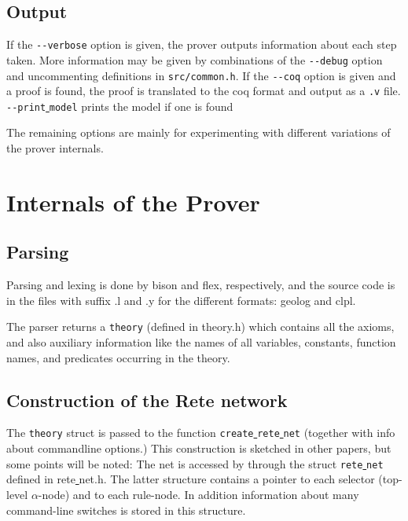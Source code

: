 \documentclass[a4paper]{article}
\begin{document}
\subsection{Output}
If the \verb|--verbose| option is given, the prover outputs information about each step taken. More information may be given by combinations of the \verb|--debug| option and uncommenting definitions in \verb|src/common.h|. 
If the \verb|--coq| option is given and a proof is found, the proof is translated to the coq format and output as a \verb|.v| file. \verb|--print|\underline{ }\verb|model| prints the model if one is found


The remaining options are mainly for experimenting with different variations of the prover internals. 

\section{Internals of the Prover}

\subsection{Parsing}
Parsing and lexing is done by bison and flex, respectively, and the source code is in the files with suffix .l and .y for the different formats: geolog and clpl. 

The parser returns a \verb|theory| (defined in theory.h) which contains all the axioms, and also auxiliary information like the names of all variables, constants, function names, and predicates occurring in the theory. 

\subsection{Construction of the Rete network}
The \verb|theory| struct is passed to the function \verb|create|\underline{ }\verb|rete|\underline{ }\verb|net| (together with info about commandline options.) This construction is sketched in other papers, but some points will be noted: The net is accessed by through the struct \verb|rete|\underline{ }\verb|net| defined in rete\underline{ }net.h. The latter structure contains a pointer to each selector (top-level $\alpha$-node) and to each rule-node. In addition information about many command-line switches is stored in this structure. 
\end{document}
